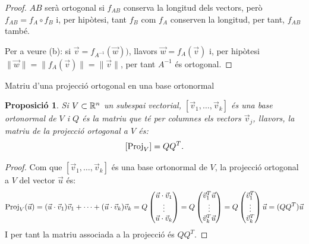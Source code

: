 \documentclass[
  11pt,
]{book}
\makeatletter
\numberwithin{dummy}{section}
\theoremstyle{maincolornumbox}
\theoremstyle{blacknumex}
\theoremstyle{blacknumbox}
\theoremstyle{maincolornum}
\newtheorem{propositionT}{Proposició}[chapter]
\newenvironment{proposition}{\begin{pBox}\begin{propositionT}}{\end{propositionT}\end{pBox}}
\renewcommand{\section}{\@startsection{section}{1}{\z@}
{-4ex \@plus -1ex \@minus -.4ex}
{1ex \@plus.2ex }
{\normalfont\large\sffamily\bfseries}}
\newlength\esp
\makeatother
\begin{document}
\begin{proof}
\(AB\) serà ortogonal si \(f_{AB}\) conserva la longitud dels
vectors, però \(f_{AB}=f_A \circ f_B\) i, per hipòtesi, tant \(f_B\) com
\(f_A\) conserven la longitud, per tant, \(f_{AB}\) també.

Per a veure (b): si \(\vec v = f_{A^{-1}}(\vec w))\), llavors
\(\vec w=f_A(\vec v)\) i, per hipòtesi
\(\|\vec w\|=\|f_A(\vec v)\|=\|\vec v\|\), per tant \(A^{-1}\) és
ortogonal.
\end{proof}

\section{Matriu d'una projecció ortogonal en una base ortonormal}\label{matriu-duna-projecciuxf3-ortogonal-en-una-base-ortonormal}

\begin{proposition}
Si \(V\subset \mathbb{R}^n\) un subespai vectorial, \([\vec v_1, \dots, \vec v_k]\)
és una base ortonormal de \(V\) i \(Q\) és la matriu que té per columnes els
vectors \(\vec v_j\), llavors, la matriu de la projecció ortogonal a \(V\)
és: \[[\operatorname{Proj}_V]=Q Q^T.\]
\end{proposition}

\begin{proof}
Com que \([\vec v_1, \dots, \vec v_k]\) és una base ortonormal de
\(V\), la projecció ortogonal a \(V\) del vector \(\vec u\) és:
\[\operatorname{Proj}_V(\vec u)=(\vec u\cdot \vec v_1)\vec v_1 + \cdots + (\vec u\cdot \vec v_k)\vec v_k = Q \begin{pmatrix}
 \vec u\cdot \vec v_1 \\ \vdots \\ \vec u\cdot \vec v_k \end{pmatrix}= Q \begin{pmatrix}
 \vec v_1^T \vec u \\ \vdots \\ \vec v_k^T \vec u
 \end{pmatrix} = Q
 \begin{pmatrix}
 \vec v_1^T \\
 \vdots \\
 \vec v_k^T
 \end{pmatrix} \vec u
 =(QQ^T)\vec u\] I per tant la matriu associada a la projecció és
\(QQ^T\).
\end{proof}
\end{document}
